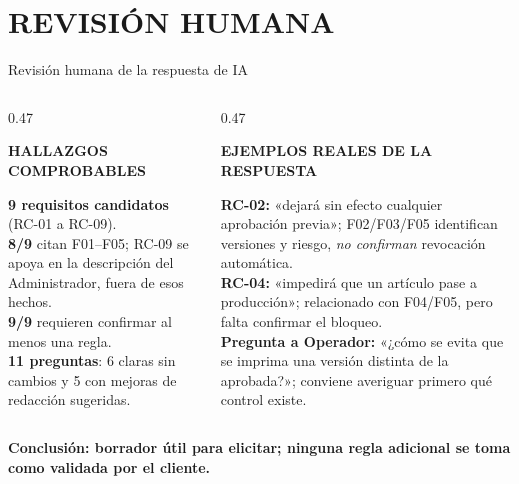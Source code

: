 \documentclass[aspectratio=169,12pt]{beamer}
\newcommand{\etiqueta}[1]{{\fontsize{7.5}{9}\selectfont\bfseries\color{Accent}#1\par}}
\newcommand{\fuentesactuales}{}
\newcommand{\fuentesdiapositiva}[1]{\gdef\fuentesactuales{#1}}
\begin{document}
\section{REVISIÓN HUMANA}
\begin{frame}[t,shrink=14]{Revisión humana de la respuesta de IA}
\fuentesdiapositiva{PrintFlow: contexto F01--F05 y evidencias/respuesta-ia.txt}
\vspace{1mm}
\begin{columns}[T,onlytextwidth]
\begin{column}{0.47\textwidth}
\etiqueta{HALLAZGOS COMPROBABLES}
\vspace{1.5mm}
{\fontsize{10}{13}\selectfont
\textbf{9 requisitos candidatos} (RC-01 a RC-09).\\[2mm]
\textbf{8/9} citan F01--F05; RC-09 se apoya en la descripción del Administrador, fuera de esos hechos.\\[2mm]
\textbf{9/9} requieren confirmar al menos una regla.\\[2mm]
\textbf{11 preguntas}: 6 claras sin cambios y 5 con mejoras de redacción sugeridas.
\par}
\end{column}
\begin{column}{0.47\textwidth}
\etiqueta{EJEMPLOS REALES DE LA RESPUESTA}
\vspace{1.5mm}
{\fontsize{9.3}{12}\selectfont
\textbf{RC-02:} «dejará sin efecto cualquier aprobación previa»; F02/F03/F05 identifican versiones y riesgo, \emph{no confirman} revocación automática.\\[2mm]
\textbf{RC-04:} «impedirá que un artículo pase a producción»; relacionado con F04/F05, pero falta confirmar el bloqueo.\\[2mm]
\textbf{Pregunta a Operador:} «¿cómo se evita que se imprima una versión distinta de la aprobada?»; conviene averiguar primero qué control existe.
\par}
\end{column}
\end{columns}
\vspace{2.5mm}
{\fontsize{8.5}{10.5}\selectfont\bfseries\color{Accent}
Conclusión: borrador útil para elicitar; ninguna regla adicional se toma como validada por el cliente.\par}
\vspace{1mm}
\end{frame}
\end{document}
